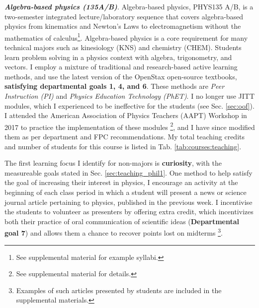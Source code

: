 \documentclass[../../../main.tex]{subfiles}
\begin{document}
\textbf{\textit{Algebra-based physics (135A/B)}}. Algebra-based physics, PHYS135 A/B, is a two-semester integrated lecture/laboratory sequence that covers algebra-based physics from kinematics and Newton's Laws to electromagnetism without the mathematics of calculus\footnote{See supplemental material for example syllabi.}.  Algebra-based physics is a core requirement for many technical majors such as kinesiology (KNS) and chemistry (CHEM).  Students learn problem solving in a physics context with algebra, trigonometry, and vectors.  I employ a mixture of traditional and research-based active learning methods, and use the latest version of the OpenStax open-source textbooks, \textbf{satisfying departmental goals 1, 4, and 6}.  These methods are \textit{Peer Instruction (PI)} and \textit{Physics Education Technology (PhET)}.  I no longer use JITT modules, which I experienced to be ineffective for the students (see Sec. \ref{sec:oof}).  I attended the American Association of Physics Teachers (AAPT) Workshop in 2017 to practice the implementation of these modules \footnote{See supplemental material for details.}, and I have since modified them as per department and FPC recommendations.  My total teaching credits and number of students for this course is listed in Tab. \ref{tab:courses:teaching}.  \\ \hspace{0.1cm}

The first learning focus I identify for non-majors is \textbf{curiosity}, with the measureable goals stated in Sec. \ref{sec:teaching_phil1}.  One method to help satisfy the goal of increasing their interest in physics, I encourage an activity at the beginning of each class period in which a student will present a news or science journal article pertaining to physics, published in the previous week.  I incentivise the students to volunteer as presenters by offering extra credit, which incentivizes both their practice of oral communication of scientific ideas (\textbf{Departmental goal 7}) and allows them a chance to recover points lost on midterms \footnote{Examples of such articles presented by students are included in the supplemental materials.}. \\ \hspace{0.1cm}
\end{document}
